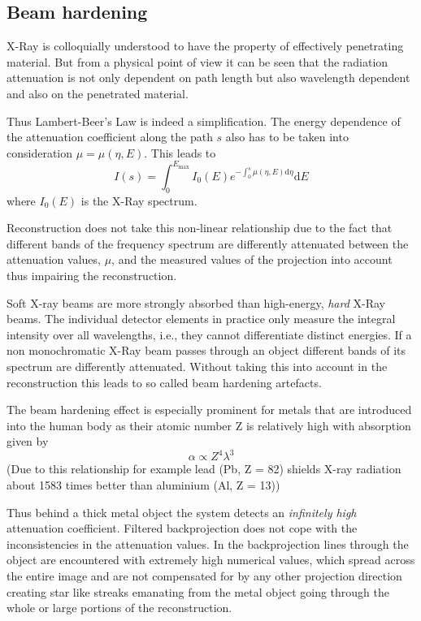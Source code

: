\subsection{Beam hardening\cite{buzug}}
\par X-Ray is colloquially understood to have the property of effectively penetrating material. But from a physical point of view it can be seen that the radiation attenuation is not only dependent on path length but also wavelength dependent and also on the penetrated material.
\par Thus Lambert-Beer's Law is indeed a simplification. The energy dependence of the attenuation coefficient along the path \(s\) also has to be taken into consideration \(\mu = \mu(\eta,E)\). This leads to \[I(s) = \int_0^{E_{\textrm{max}}}I_0(E)e^{-\int_0^{s}\mu(\eta,E)\textrm{d}\eta}\textrm{d}E\] where \(I_0(E)\) is the X-Ray spectrum.
\par Reconstruction does not take this non-linear relationship due to the fact that different bands of the frequency spectrum are differently attenuated between the attenuation values, \(\mu\), and the measured values of the projection into account thus impairing the reconstruction.
\par Soft X-ray beams are more strongly absorbed than high-energy, \emph{hard} X-Ray beams. The individual detector elements in practice only measure the integral intensity over all wavelengths, i.e., they cannot differentiate distinct energies. If a non monochromatic X-Ray beam passes through an object different bands of its spectrum are differently attenuated. Without taking this into account in the reconstruction this leads to so called beam hardening artefacts.
\par The beam hardening effect is especially prominent for metals that are introduced into the human body as their atomic number Z is relatively high with absorption given by \[\alpha \propto Z^4\lambda^3\] (Due to this relationship for example lead (Pb, Z = 82) shields X-ray radiation about 1583 times better than aluminium (Al, Z = 13))
\par Thus behind a thick metal object the system detects an \emph{infinitely high} attenuation coefficient. Filtered backprojection does not cope with the inconsistencies in the attenuation values. In the backprojection lines through the object are encountered with extremely high numerical values, which spread across the entire image and are not compensated for by any other projection direction creating star like streaks emanating from the metal object going through the whole or large portions of the reconstruction.\cite{buzug}
